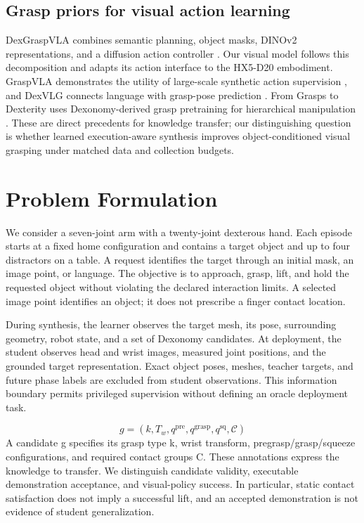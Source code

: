 \documentclass[letterpaper,10pt,conference]{ieeeconf}
\begin{document}
\subsection{Grasp priors for visual action learning}
DexGraspVLA combines semantic planning, object masks, DINOv2 representations, and a diffusion action controller \cite{dexgraspvla}. Our visual model follows this decomposition and adapts its action interface to the HX5-D20 embodiment. GraspVLA demonstrates the utility of large-scale synthetic action supervision \cite{graspvla}, and DexVLG connects language with grasp-pose prediction \cite{dexvlg}. From Grasps to Dexterity uses Dexonomy-derived grasp pretraining for hierarchical manipulation \cite{fromgraspstodexterity}. These are direct precedents for knowledge transfer; our distinguishing question is whether learned execution-aware synthesis improves object-conditioned visual grasping under matched data and collection budgets.

\section{Problem Formulation}
We consider a seven-joint arm with a twenty-joint dexterous hand. Each episode starts at a fixed home configuration and contains a target object and up to four distractors on a table. A request identifies the target through an initial mask, an image point, or language. The objective is to approach, grasp, lift, and hold the requested object without violating the declared interaction limits. A selected image point identifies an object; it does not prescribe a finger contact location.

During synthesis, the learner observes the target mesh, its pose, surrounding geometry, robot state, and a set of Dexonomy candidates. At deployment, the student observes head and wrist images, measured joint positions, and the grounded target representation. Exact object poses, meshes, teacher targets, and future phase labels are excluded from student observations. This information boundary permits privileged supervision without defining an oracle deployment task.

\begin{equation}
g=(k,T_w,q^{\mathrm{pre}},q^{\mathrm{grasp}},q^{\mathrm{sq}},\mathcal{C})
\label{eq:candidate}
\end{equation}
A candidate g specifies its grasp type k, wrist transform, pregrasp/grasp/squeeze configurations, and required contact groups C. These annotations express the knowledge to transfer. We distinguish candidate validity, executable demonstration acceptance, and visual-policy success. In particular, static contact satisfaction does not imply a successful lift, and an accepted demonstration is not evidence of student generalization.
\end{document}
